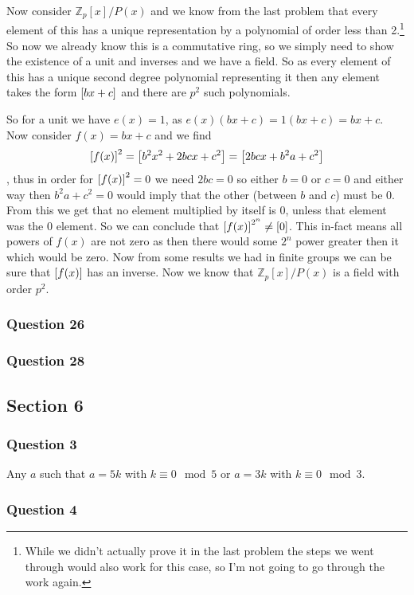 \documentclass{article}
\begin{document}
Now consider $\mathbb Z_p[x]/P(x)$ and we know from the last problem that every element of this has a unique representation by a polynomial of order less than 2.\footnote{While we didn't actually prove it in the last problem the steps we went through would also work for this case, so I'm not going to go through the work again.} So now we already know this is a commutative ring, so we simply need to show the existence of a unit and inverses and we have a field. So as every element of this has a unique second degree polynomial representing it then any element takes the form $\left[{bx+c}\right]$ and there are $p^2$ such polynomials.

So for a unit we have $e(x) = 1$, as $e(x)(bx+c) = 1(bx+c) = bx+c$. Now consider $f(x) = bx+c$ and we find $$\left[{f(x)}\right]^2 = \left[{b^2x^2+2bcx+c^2}\right] = \left[{2bcx+b^2a+c^2}\right]$$, thus in order for $\left[{f(x)}\right]^2 = 0$ we need $2bc = 0$ so either $b=0$ or $c=0$ and either way then $b^2a+c^2=0$ would imply that the other (between $b$ and $c$) must be $0$. From this we get that no element multiplied by itself is 0, unless that element was the 0 element. So we can conclude that $\left[{f(x)}\right]^{2^n} \not=\left[{0}\right]$. This in-fact means all powers of $f(x)$ are not zero as then there would some $2^n$ power greater then it which would be zero. Now from some results we had in finite groups we can be sure that $\left[{f(x)}\right]$ has an inverse. Now we know that $\mathbb Z_p[x]/P(x)$ is a field with order $p^2$.



\subsubsection{Question 26}



\subsubsection{Question 28}

\subsection{Section 6}
\subsubsection{Question 3}
Any $a$ such that $a=5k$ with $k\equiv 0\mod 5$ or $a=3k$ with $k\equiv 0\mod3$.
\subsubsection{Question 4}
\end{document}
